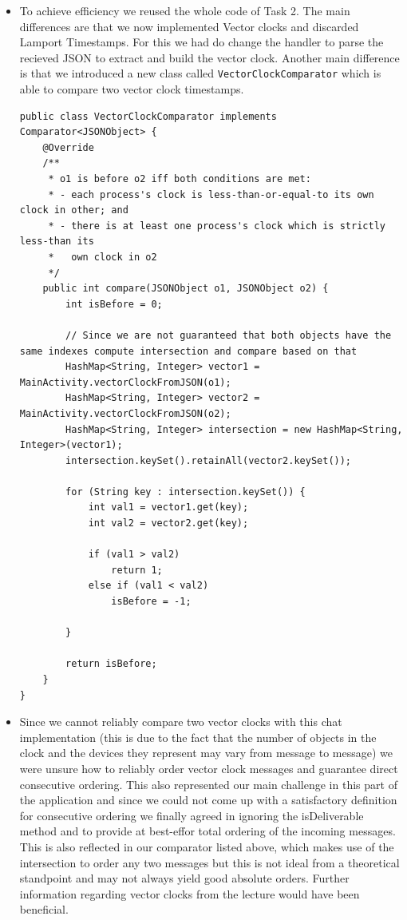 \documentclass{report}
\begin{document}
\begin{itemize}
  \item To achieve efficiency we reused the whole code of Task 2. The main differences are that we now implemented Vector clocks and discarded Lamport Timestamps. For this we had do change the handler to parse the recieved JSON to extract and build the vector clock. Another main difference is that we introduced a new class called \texttt{VectorClockComparator} which is able to compare two vector clock timestamps.

\begin{lstlisting}
public class VectorClockComparator implements Comparator<JSONObject> {
	@Override
	/**
     * o1 is before o2 iff both conditions are met:
     * - each process's clock is less-than-or-equal-to its own clock in other; and
     * - there is at least one process's clock which is strictly less-than its
     *   own clock in o2
     */
    public int compare(JSONObject o1, JSONObject o2) {
		int isBefore = 0;
		
		// Since we are not guaranteed that both objects have the same indexes compute intersection and compare based on that
		HashMap<String, Integer> vector1 = MainActivity.vectorClockFromJSON(o1);
		HashMap<String, Integer> vector2 = MainActivity.vectorClockFromJSON(o2);
		HashMap<String, Integer> intersection = new HashMap<String, Integer>(vector1);
		intersection.keySet().retainAll(vector2.keySet());
		
		for (String key : intersection.keySet()) {
			int val1 = vector1.get(key);
			int val2 = vector2.get(key);
			
			if (val1 > val2)
				return 1;
			else if (val1 < val2)
				isBefore = -1;
			
		}
		
		return isBefore;
	}
}
\end{lstlisting}
  \item Since we cannot reliably compare two vector clocks with this chat implementation (this is due to the fact that the number of objects in the clock and the devices they represent may vary from message to message) we were unsure how to reliably order vector clock messages and guarantee direct consecutive ordering. This also represented our main challenge in this part of the application and since we could not come up with a satisfactory definition for consecutive ordering we finally agreed in ignoring the isDeliverable method and to provide at best-effor total ordering of the incoming messages. This is also reflected in our comparator listed above, which makes use of the intersection to order any two messages but this is not ideal from a theoretical standpoint and may not always yield good absolute orders. Further information regarding vector clocks from the lecture would have been beneficial.
\end{itemize}
\end{document}
